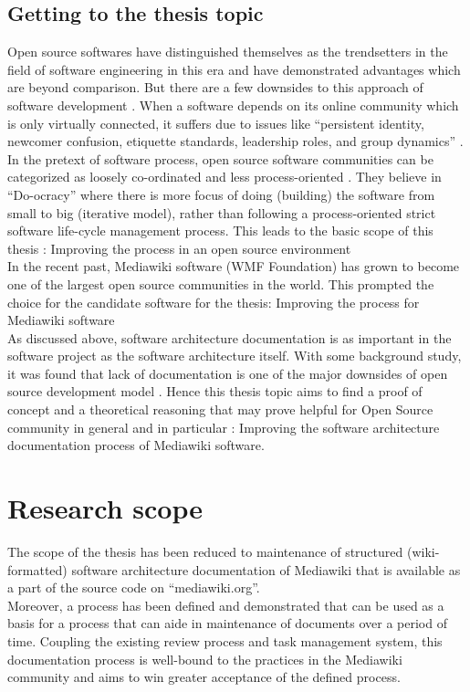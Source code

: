 {\subsection{Getting to the thesis topic}
\indent Open source softwares have distinguished themselves as the trendsetters in the field of software engineering in this era and have demonstrated advantages which are beyond comparison. But there are a few downsides to this approach of software development \cite{Scacchi2007}. When a software depends on its online community which is only virtually connected, it suffers due to issues like  \enquote{persistent identity, newcomer confusion, etiquette standards, leadership roles, and group dynamics} \cite{Kim:2000:CBW:518514}. In the pretext of software process, open source software communities can be categorized as loosely co-ordinated and less process-oriented \cite{Zhao2003}. They believe in \enquote{Do-ocracy} where there is more focus of doing (building) the software from small to big (iterative model), rather than following a process-oriented strict software life-cycle management process. This leads to the basic scope of this thesis : Improving the process in an open source environment
\\\indent In the recent past, Mediawiki software (WMF Foundation) has grown to become one of the largest open source communities in the world. This prompted the choice for the candidate software for the thesis: Improving the process for Mediawiki software
\\\indent As discussed above, software architecture documentation is as important in the software project as the software architecture itself. With some background study, it was found that lack of documentation is one of the major downsides of open source development model \cite{6923128} \cite{Zhao2003}. Hence this thesis topic aims to find a proof of concept  and a theoretical reasoning that may prove helpful for Open Source community in general and in particular : Improving the software architecture documentation process of Mediawiki software.

\section{Research scope}\label{sec:scope}
The scope of the thesis has been reduced to maintenance of structured (wiki-formatted) software architecture documentation of Mediawiki that is available as a part of the source code on \enquote{mediawiki.org}.
\\\indent Moreover, a process has been defined and demonstrated that can be used as a basis for a process that can aide in maintenance of documents over a period of time. Coupling the existing review process and task management system, this documentation process is well-bound to the practices in the Mediawiki community and aims to win greater acceptance of the defined process. \cite{6923128}

}
